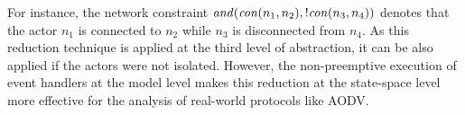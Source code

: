 For instance, the network constraint ${\it and}({\it con}(n_1,n_2),!{\it con}(n_3,n_4))$ denotes that the actor  $n_1$ is connected to $n_2$ while $n_3$ is disconnected from $n_4$. %
As this reduction technique is applied at the third level of abstraction, it can be also applied if the actors were not isolated. %
However, the non-preemptive execution of event handlers at the model level makes this reduction at the state-space level more effective for the analysis of real-world protocols like AODV. 

